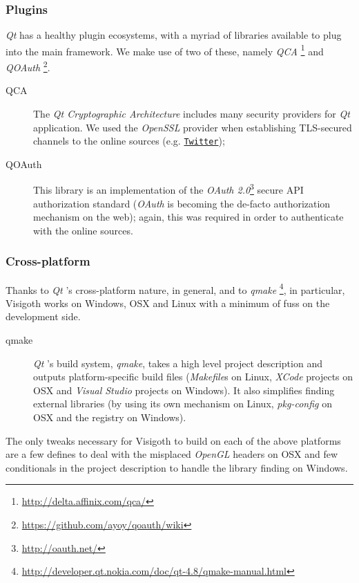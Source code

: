 \documentclass[a4paper,11pt,titlepage]{article}
\let\stdhref\href
\renewcommand{\href}[2]{\stdhref{#1}{\texttt{#2}}}
\newcommand{\buzz}[1]{\emph{#1}}
\newcommand{\Qt}{\buzz{Qt} }
\newcommand{\OpenGL}{\buzz{OpenGL} }
\begin{document}
\subsubsection{Plugins}

\Qt has a healthy plugin ecosystems, with a myriad of libraries
available to plug into the main framework. We make use of two of
these, namely
\buzz{QCA} \footnote{\url{http://delta.affinix.com/qca/}} and
\buzz{QOAuth} \footnote{\url{https://github.com/ayoy/qoauth/wiki}}.

\begin{description}
\item [QCA] The \buzz{Qt Cryptographic Architecture} includes many
  security providers for \Qt application. We used the \buzz{OpenSSL}
  provider when establishing TLS-secured channels to the online
  sources (e.g. \href{http://twitter.com}{Twitter});
\item [QOAuth] This library is an implementation of the \buzz{OAuth
  2.0}\footnote{\url{http://oauth.net/}} secure API authorization
  standard (\buzz{OAuth} is becoming the de-facto authorization
  mechanism on the web); again, this was required in order to
  authenticate with the online sources.
\end{description}

\subsubsection{Cross-platform}

Thanks to \Qt's cross-platform nature, in general, and to
\buzz{qmake} \footnote{\url{http://developer.qt.nokia.com/doc/qt-4.8/qmake-manual.html}},
in particular, Visigoth works on Windows, OSX and Linux with a minimum
of fuss on the development side.

\begin{description}
\item [qmake] \Qt's build system, \buzz{qmake}, takes a high level
  project description and outputs platform-specific build files
  (\buzz{Makefile}s on Linux, \buzz{XCode} projects on OSX and
  \buzz{Visual Studio} projects on Windows). It also simplifies
  finding external libraries (by using its own mechanism on Linux,
  \buzz{pkg-config} on OSX and the registry on Windows).
\end{description}

The only tweaks necessary for Visigoth to build on each of the above
platforms are a few defines to deal with the misplaced \OpenGL headers
on OSX and few conditionals in the project description to handle the
library finding on Windows.
\end{document}
